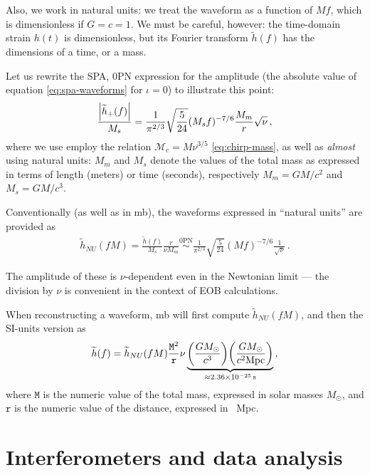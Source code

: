 \documentclass[main.tex]{subfiles}
\begin{document}
Also, we work in natural units: we treat the waveform as a function of \(Mf\), which is dimensionless if \(G = c = 1\).
We must be careful, however: the time-domain strain \(h(t)\) is dimensionless, but its Fourier transform \(\widetilde{h}(f)\) has the dimensions of a time, or a mass.

Let us rewrite the \ac{SPA}, 0PN expression for the amplitude (the absolute value of equation \ref{eq:spa-waveforms} for \(\iota = 0\)) to illustrate this point: 
%
\begin{align}
\frac{\abs{\widetilde{h}_+ (f)}}{M_s} = \frac{1}{\pi^{2/3}} \sqrt{ \frac{5}{24}}
(M_s f)^{-7/6} \frac{M_m}{r} \sqrt{\nu }
\,,
\end{align}
%
where we use employ the relation \(\mathcal{M}_c = M \nu^{3/5}\) \eqref{eq:chirp-mass}, as well as \emph{almost} using natural units: \(M_m\) and \(M_s\) denote the values of the total mass as expressed in terms of length (meters) or time (seconds), respectively \(M_m = GM / c^2\) and \(M_s = GM / c^3\).

Conventionally (as well as in \ac{mb}), the waveforms expressed in ``natural units'' are provided as 
%
\begin{align}
\widetilde{h}_{NU} (fM) = \frac{\widetilde{h}(f)}{M_s} \frac{r}{\nu M_m} \overset{\text{0PN}}{\sim} \frac{1}{\pi^{2/3}} \sqrt{ \frac{5}{24}} (Mf)^{-7/6} \frac{1}{\sqrt{ \nu }}
\,.
\end{align}

The amplitude of these is  \(\nu \)-dependent even in the Newtonian limit --- the division by \(\nu \) is convenient in the context of \ac{EOB} calculations. 

When reconstructing a waveform, \ac{mb} will first compute \(\widetilde{h}_{NU} (fM)\), and then the \ac{SI}-units version as 
%
\begin{align}
\widetilde{h}(f) 
= \widetilde{h}_{NU} (fM) \frac{\mathtt{M}^2}{\mathtt{r}} \nu 
\underbrace{\qty(\frac{G M_{\odot}}{c^3}) 
\qty(\frac{G M_{\odot}}{ c^2 \SI{}{Mpc} })}_{\approx \SI{2.36e-25}{s}}
\,,
\end{align}
%
where \(\mathtt{M}\) is the numeric value of the total mass, expressed in solar masses \(M_{\odot}\), and \(\mathtt{r}\) is the numeric value of the distance, expressed in \SI{}{Mpc}. 


\section{Interferometers and data analysis} \label{sec:data-analysis}
\end{document}
